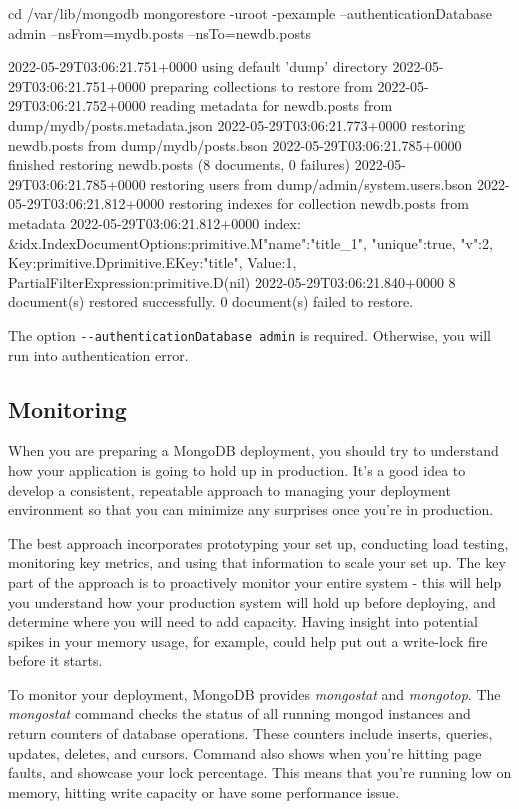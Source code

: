 \documentclass[12pt]{article}
\begin{document}
\begin{bashcode}
\begin{bashcode}
\begin{bashcode}
cd /var/lib/mongodb
mongorestore -uroot -pexample --authenticationDatabase admin --nsFrom=mydb.posts --nsTo=newdb.posts

2022-05-29T03:06:21.751+0000    using default 'dump' directory
2022-05-29T03:06:21.751+0000    preparing collections to restore from
2022-05-29T03:06:21.752+0000    reading metadata for newdb.posts from dump/mydb/posts.metadata.json
2022-05-29T03:06:21.773+0000    restoring newdb.posts from dump/mydb/posts.bson
2022-05-29T03:06:21.785+0000    finished restoring newdb.posts (8 documents, 0 failures)
2022-05-29T03:06:21.785+0000    restoring users from dump/admin/system.users.bson
2022-05-29T03:06:21.812+0000    restoring indexes for collection newdb.posts from metadata
2022-05-29T03:06:21.812+0000    index: &idx.IndexDocument{Options:primitive.M{"name":"title_1", "unique":true, "v":2}, Key:primitive.D{primitive.E{Key:"title", Value:1}}, PartialFilterExpression:primitive.D(nil)}
2022-05-29T03:06:21.840+0000    8 document(s) restored successfully. 0 document(s) failed to restore.
\end{bashcode}
The option \verb=--authenticationDatabase admin= is required. Otherwise,
you will run into authentication error.

\subsection{Monitoring}

When you are preparing a MongoDB deployment, you should try to
understand how your application is going to hold up in production. It’s
a good idea to develop a consistent, repeatable approach to managing
your deployment environment so that you can minimize any surprises once
you’re in production.

The best approach incorporates prototyping your set up, conducting load
testing, monitoring key metrics, and using that information to scale
your set up. The key part of the approach is to proactively monitor your
entire system - this will help you understand how your production system
will hold up before deploying, and determine where you will need to add
capacity. Having insight into potential spikes in your memory usage, for
example, could help put out a write-lock fire before it starts.

To monitor your deployment, MongoDB provides \emph{mongostat} and
\emph{mongotop}. The \emph{mongostat} command checks the status of all
running mongod instances and return counters of database operations.
These counters include inserts, queries, updates, deletes, and cursors.
Command also shows when you’re hitting page faults, and showcase your
lock percentage. This means that you're running low on memory, hitting
write capacity or have some performance issue.


\end{bashcode}
\end{bashcode}
\end{document}
